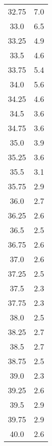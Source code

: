 \begin{table}
\begin{tabular}{S[]S[]}
32.75 & 7.0\\
33.0 & 6.5\\
33.25 & 4.9\\
33.5 & 4.6\\
33.75 & 5.4\\
34.0 & 5.6\\
34.25 & 4.6\\
34.5 & 3.6\\
34.75 & 3.6\\
35.0 & 3.9\\
35.25 & 3.6\\
35.5 & 3.1\\
35.75 & 2.9\\
36.0 & 2.7\\
36.25 & 2.6\\
36.5 & 2.5\\
36.75 & 2.6\\
37.0 & 2.6\\
37.25 & 2.5\\
37.5 & 2.3\\
37.75 & 2.3\\
38.0 & 2.5\\
38.25 & 2.7\\
38.5 & 2.7\\
38.75 & 2.5\\
39.0 & 2.3\\
39.25 & 2.6\\
39.5 & 2.9\\
39.75 & 2.9\\
40.0 & 2.6\\
\bottomrule
\end{tabular}\end{table}